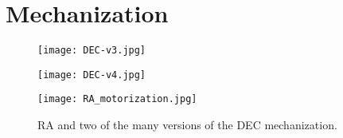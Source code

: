 \section{Mechanization}
\label{sec:mechanization}



\begin{figure*}
    \begin{minipage}[c][10cm][c]{0.5\textwidth}
        \centering
        \vspace*{\fill}
        \texttt{[image: DEC-v3.jpg]}
        \label{fig:DEC_mechanism_v3}
        
        \addtocounter{subfigure}{1}
        \texttt{[image: DEC-v4.jpg]}
        \addtocounter{subfigure}{-2}
        \label{fig:DEC_mechanism_v1p} 
    \end{minipage}
    \begin{minipage}[c][10cm][t]{0.5\textwidth}
        \vspace*{\fill}
        \centering
        \texttt{[image: RA\_motorization.jpg]}
        \label{fig:RA_mechanization}
    \end{minipage}
    \caption{RA and two of the many versions of the DEC mechanization.}
    \label{fig:dec-versions}
\end{figure*}

